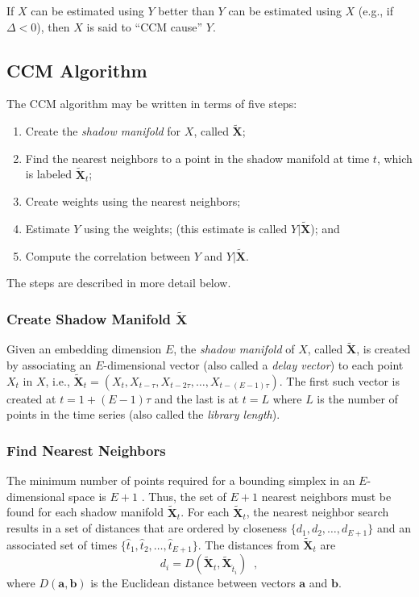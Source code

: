 \documentclass[twocolumn,aps,pre,groupedaddress]{revtex4-1}
\begin{document}
If $X$ can be estimated using $Y$ better than $Y$ can be estimated using $X$ (e.g., if $\Delta < 0$), then $X$ is said to ``CCM cause'' $Y$.

\subsection{CCM Algorithm}
\label{sec:appA}
The CCM algorithm may be written in terms of five steps:
\begin{enumerate}
\item 
Create the {\em shadow manifold} for $X$, called $\tilde{\mathbf{X}}$;
\item Find the nearest neighbors to a point in the shadow manifold at time $t$, which is labeled $\tilde{\mathbf{X}}_t$;
\item Create weights using the nearest neighbors;
\item Estimate $Y$ using the weights; (this estimate is called $Y|\tilde{\mathbf{X}}$); and
\item Compute the correlation between $Y$ and $Y|\tilde{\mathbf{X}}$. 
\end{enumerate}
The steps are described in more detail below.  

\subsubsection{Create Shadow Manifold $\tilde{\mathbf{X}}$}
\label{sec:shadow}
Given an embedding dimension $E$, the {\em shadow manifold} of $X$, called $\tilde{\mathbf{X}}$, is created by associating an $E$-dimensional vector (also called a {\em delay vector}) to each point $X_t$ in $X$, i.e., $\tilde{\mathbf{X}}_t=\left(X_t,X_{t-\tau},X_{t-2\tau},\ldots,X_{t-(E-1)\tau}\right)$.  The first such vector is created at $t=1+(E-1)\tau$ and the last is at $t=L$ where $L$ is the number of points in the time series (also called the {\em library length}).  

\subsubsection{Find Nearest Neighbors}
The minimum number of points required for a bounding simplex in an $E$-dimensional space is $E+1$ \cite{Sugihara1990,Sugihara1990a}.  Thus,  the set of $E+1$ nearest neighbors must be found for each shadow manifold $\tilde{\mathbf{X}}_t$.  For each $\tilde{\mathbf{X}}_t$, the nearest neighbor search results in a set of distances that are ordered by closeness $\{d_1,d_2,\ldots,d_{E+1}\}$ and an associated set of times $\{\hat{t}_1,\hat{t}_2,\ldots,\hat{t}_{E+1}\}$.  The distances from $\tilde{\mathbf{X}}_t$ are
$$
d_i = D\left(\tilde{\mathbf{X}}_t,\tilde{\mathbf{X}}_{\hat{t}_i}\right)\;\;,
$$
where $D(\mathbf{a},\mathbf{b})$ is the Euclidean distance between vectors $\mathbf{a}$ and $\mathbf{b}$.
\end{document}
